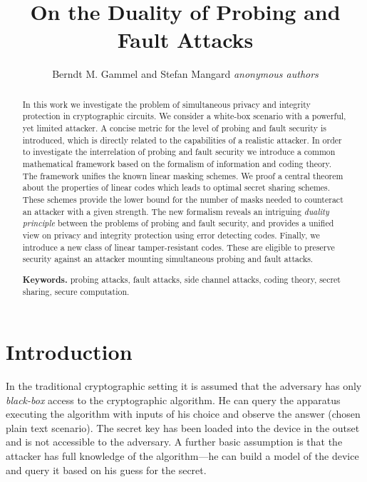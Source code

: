 \documentclass[11pt]{llncs}
\begin{document}
\title{On the Duality of Probing and Fault Attacks}
\author{\ifHIDE
  Berndt M. Gammel and Stefan Mangard
\else
  \emph{anonymous authors}\newline
\fi }
\ifHIDE
 \institute{Infineon Technologies AG \\
            Munich, Germany\1em]
            \email{Berndt.Gammel@infineon.com}\\
            \email{Stefan.Mangard@infineon.com}}
\else
 \institute{\quad\vspace*{8em}}
\fi
\maketitle


\begin{abstract}
In this work we investigate the problem of simultaneous privacy and
integrity protection in cryptographic circuits. We consider a
white-box scenario with a powerful, yet limited attacker. A concise
metric for the level of probing and fault security is introduced,
which is directly related to the capabilities of a realistic
attacker. In order to investigate the interrelation of probing and
fault security we introduce a common mathematical framework based on
the formalism of information and coding theory. The framework
unifies the known linear masking schemes. We proof a central theorem
about the properties of linear codes which leads to optimal secret
sharing schemes. These schemes provide the lower bound for the
number of masks needed to counteract an attacker with a given
strength. The new formalism reveals an intriguing \emph{duality
principle} between the problems of probing and fault security, and
provides a unified view on privacy and integrity protection using
error detecting codes. Finally, we introduce a new class of linear
tamper-resistant codes. These are eligible to preserve security
against an attacker mounting simultaneous probing and fault attacks.

\vspace*{1em}
\textbf{Keywords.}
  probing attacks, fault attacks, side channel attacks,
  coding theory, secret sharing, secure computation.
\end{abstract}


\section{Introduction}   \label{Sec:Introduction}

In the traditional cryptographic setting it is assumed that
the adversary has only \emph{black-box} access to the cryptographic algorithm.
He can query the apparatus executing
the algorithm with inputs of his choice and
observe the answer (chosen plain text scenario).
The secret key has been loaded into
the device in the outset and is not accessible to the adversary.
A further basic assumption is that the attacker has full knowledge of
the algorithm---he can build a model of the device
and query it based on his guess for the secret.
\end{document}
